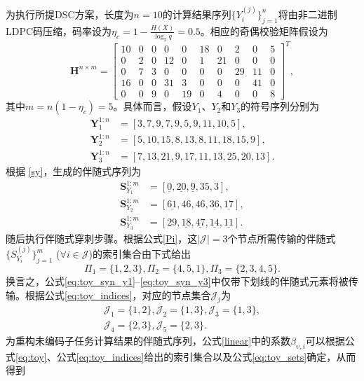 为执行所提DSC方案，长度为$n=10$的计算结果序列$\{Y_i^{(j)}\}_{j=1}^n$将由非二进制LDPC码压缩，码率设为$\eta_c=1-\frac{H(X)}{\log_2 q}=0.5$。相应的奇偶校验矩阵假设为
\begin{equation}
	\mathbf{H}^{n \times m} =
	\begin{bmatrix}
		10 & 0 & 0 & 0 & 0 & 18 & 0 & 2 & 0 & 5 \\
		0 & 2 & 0 & 12 & 0 & 1 & 21 & 0 & 0 & 0 \\
		0 & 7 & 3 & 0 & 0 & 0 & 0 & 29 & 11 & 0 \\
		16 & 0 & 0 & 31 & 3 & 0 & 0 & 0 & 41 & 0 \\
		0 & 0 & 9 & 0 & 19 & 0 & 4 & 0 & 0 & 8
	\end{bmatrix}^T,
	\label{eq:toy_matrix}
\end{equation}
其中$m=n(1-\eta_c)=5$。具体而言，假设$Y_1$、$Y_2$和$Y_3$的符号序列分别为
\begin{subequations}
	\begin{align}
		\mathbf{Y}_1^{1:n} &= [3, 7, 9, 7, 9, 5, 9, 11, 10, 5], \label{eq:toy_seq_y1} \\
		\mathbf{Y}_2^{1:n} &= [5, 10, 15, 8, 13, 8, 11, 18, 15, 9], \label{eq:toy_seq_y2} \\
		\mathbf{Y}_3^{1:n} &= [7, 13, 21, 9, 17, 11, 13, 25, 20, 13]. \label{eq:toy_seq_y3}
	\end{align}
\end{subequations}
根据 \eqref{sy}，生成的伴随式序列为
\begin{subequations}
	\begin{align}
		\mathbf{S}_{Y_1}^{1:m} &= [\underline{0}, \underline{20}, \underline{9}, 35, 3], \label{eq:toy_syn_y1} \\
		\mathbf{S}_{Y_2}^{1:m} &= [\underline{61}, 46, 46, \underline{36}, \underline{17}], \label{eq:toy_syn_y2} \\
		\mathbf{S}_{Y_3}^{1:m} &= [29, \underline{18}, \underline{47}, \underline{14}, \underline{11}]. \label{eq:toy_syn_y3}
	\end{align}
\end{subequations}
随后执行伴随式穿刺步骤。根据公式\eqref{Pi}，这$|\mathcal{J}|=3$个节点所需传输的伴随式$\{S_{Y_i}^{(j)}\}_{j=1}^m$ ($\forall i\in\mathcal{J}$)的索引集合由下式给出
\begin{equation}
	\Pi_1 = \{1, 2, 3\}, \Pi_2 = \{4, 5, 1\}, \Pi_3 = \{2, 3, 4, 5\}.
	\label{eq:toy_indices}
\end{equation}
换言之，公式\eqref{eq:toy_syn_y1}--\eqref{eq:toy_syn_y3}中仅带下划线的伴随式元素将被传输。根据公式\eqref{eq:toy_indices}，对应的节点集合$\mathcal{J}_j$为
\begin{gather}
	\mathcal{J}_1 = \{1, 2\}, \mathcal{J}_2 = \{1, 3\}, \mathcal{J}_3 = \{1, 3\}, \nonumber \\
	\mathcal{J}_4 = \{2, 3\}, \mathcal{J}_5 = \{2, 3\}.
	\label{eq:toy_sets}
\end{gather}
为重构未编码子任务计算结果的伴随式序列，公式\eqref{linear}中的系数$\beta_{\upsilon,i}$可以根据公式\eqref{eq:toy}、公式\eqref{eq:toy_indices}给出的索引集合以及公式\eqref{eq:toy_sets}确定，从而得到

